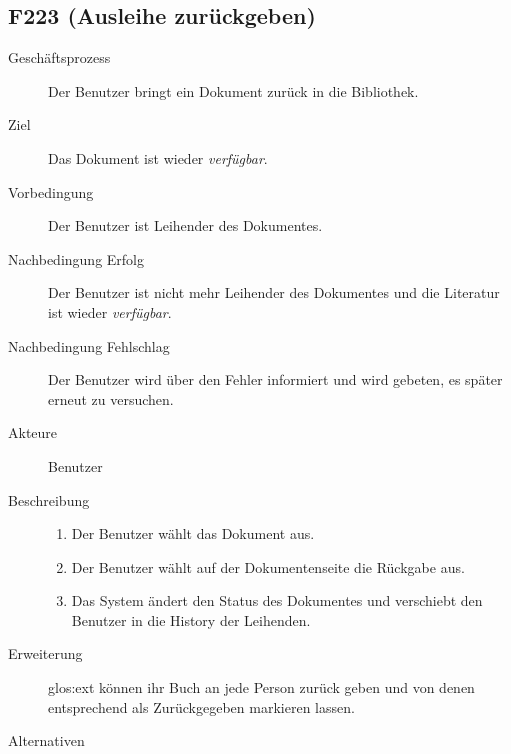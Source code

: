 \subsection{F223 (Ausleihe zurückgeben)}
\begin{description}
  \item[Geschäftsprozess]Der Benutzer bringt ein Dokument zurück in die Bibliothek.
  \item[Ziel]Das Dokument ist wieder \emph{verfügbar}.
  \item[Vorbedingung]Der Benutzer ist Leihender des Dokumentes.
  \item[Nachbedingung Erfolg]Der Benutzer ist nicht mehr Leihender des Dokumentes und die Literatur ist wieder \emph{verfügbar}.
  \item[Nachbedingung Fehlschlag]Der Benutzer wird über den Fehler informiert und wird gebeten, es später erneut zu versuchen.
  \item[Akteure]Benutzer
  \item[Beschreibung]\hfill
    \begin{enumerate}
      \item Der Benutzer wählt das Dokument aus.
      \item Der Benutzer wählt auf der Dokumentenseite die Rückgabe aus.
      \item Das System ändert den Status des Dokumentes und verschiebt den Benutzer in die History der Leihenden.
    \end{enumerate}
  \item[Erweiterung]\gls{glos:ext} können ihr Buch an jede Person zurück geben und von denen entsprechend als Zurückgegeben markieren lassen.
  \item[Alternativen]
\end{description}

